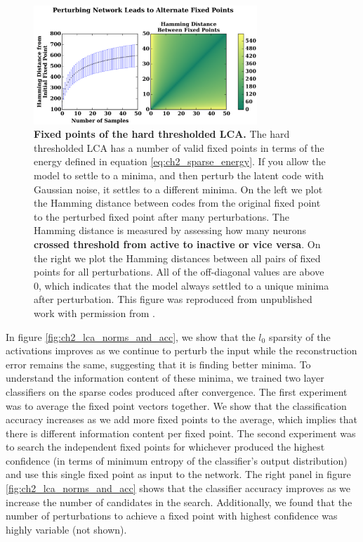 \begin{figure}[h]
    \centering
    \includegraphics[width=0.75\textwidth]{figures/lca_fixed_point_distances.png}
    \caption{\textbf{Fixed points of the hard thresholded LCA.} The hard thresholded LCA has a number of valid fixed points in terms of the energy defined in equation \eqref{eq:ch2_sparse_energy}. If you allow the model to settle to a minima, and then perturb the latent code with Gaussian noise, it settles to a different minima. On the left we plot the Hamming distance between codes from the original fixed point to the perturbed fixed point after many perturbations. The Hamming distance is measured by assessing how many neurons \textbf{crossed threshold from active to inactive or vice versa}. On the right we plot the Hamming distances between all pairs of fixed points for all perturbations. All of the off-diagonal values are above 0, which indicates that the model always settled to a unique minima after perturbation. This figure was reproduced from unpublished work with permission from \parencite{shainin2016sampling}.}
    \label{fig:ch2_lca_fixed_point_distances}
\end{figure}

In figure \ref{fig:ch2_lca_norms_and_acc}, we show that the $l_{0}$ sparsity of the activations improves as we continue to perturb the input while the reconstruction error remains the same, suggesting that it is finding better minima. To understand the information content of these minima, we trained two layer classifiers on the sparse codes produced after convergence. The first experiment was to average the fixed point vectors together. We show that the classification accuracy increases as we add more fixed points to the average, which implies that there is different information content per fixed point. The second experiment was to search the independent fixed points for whichever produced the highest confidence (in terms of minimum entropy of the classifier's output distribution) and use this single fixed point as input to the network. The right panel in figure \ref{fig:ch2_lca_norms_and_acc} shows that the classifier accuracy improves as we increase the number of candidates in the search. Additionally, we found that the number of perturbations to achieve a fixed point with highest confidence was highly variable (not shown).

